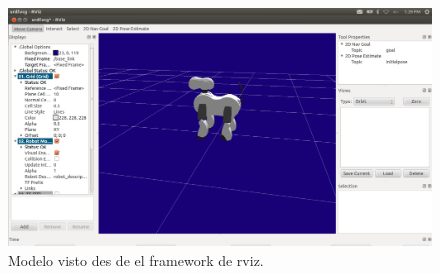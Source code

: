 \documentclass[12pt,a4paper,final,twoside]{book}
\begin{document}
\begin{figure}[H]
	\centering
    \includegraphics[scale=0.32]{images/aiborviz.png}
	 \caption{Modelo visto des de el framework de rviz.}
  \label{fig:aiborviz}
\end{figure}
\end{document}
